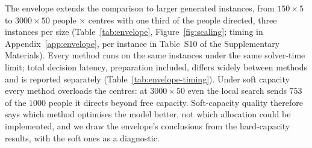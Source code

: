 \documentclass[systems,article,accept,moreauthors,pdftex]{Definitions/mdpi}
\begin{document}
The envelope extends the comparison to larger generated instances, from $150\times5$ to
$3000\times50$ people $\times$ centres with one third of the people directed, three instances per
size (Table~\ref{tab:envelope}, Figure~\ref{fig:scaling}; timing in Appendix~\ref{app:envelope},
per instance in Table~S10 of the Supplementary Materials). Every method runs on the same instances
under the same solver-time limit; total decision latency, preparation included, differs widely
between methods and is reported separately (Table~\ref{tab:envelope-timing}). Under soft capacity
every method overloads the centres: at \mbox{$3000\times50$} even the local search sends $753$ of the
$1000$ people it directs beyond free capacity. Soft-capacity quality therefore says which method
optimises the model better, not which allocation could be implemented, and we draw the
envelope's conclusions from the hard-capacity results, with the soft ones as a diagnostic.
\end{document}
